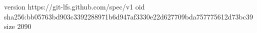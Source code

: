 version https://git-lfs.github.com/spec/v1
oid sha256:bb05763bd903c3392288971b6d947af3330e22d627709bda757775612d73bc39
size 2090
